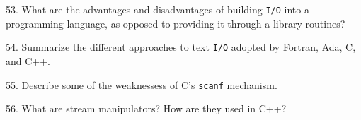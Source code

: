 \filbreak
\vskip 1cm

53. What are the advantages and disadvantages of building {\tt I/O} into a programming language, as opposed to providing it through a library routines?

\filbreak
\vskip 1cm

54. Summarize the different approaches to text {\tt I/O} adopted by Fortran, Ada, C, and C++.

\filbreak
\vskip 1cm

55. Describe some of the weaknessess of C's {\tt scanf} mechanism.

\filbreak
\vskip 1cm

56. What are stream manipulators? How are they used in C++?

\filbreak
\vfill\eject
\bye
